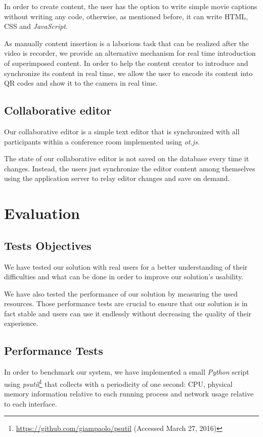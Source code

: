 \documentclass[conference,compsoc,a4paper]{IEEEtran}
\begin{document}
	In order to create content, the user has the option to write simple movie captions without writing any code, otherwise, as mentioned before, it can write \gls{HTML}, \gls{CSS} and \emph{JavaScript}.

	As manually content insertion is a laborious task that can be realized after the video is recorder, we provide an alternative mechanism for real time introduction of superimposed content.	In order to help the content creator to introduce and synchronize its content in real time, we allow the user to encode its content into \gls{QR} codes and show it to the camera in real time.


\subsection{Collaborative editor}

Our collaborative editor is a simple text editor that is synchronized with all participants within a conference room implemented using \emph{ot.js}.

The state of our collaborative editor is not saved on the database every time it changes. Instead, the users just synchronize the editor content among themselves using the application server to relay editor changes and save on demand.

\section{Evaluation}
\label{chapter:evaluation}

\subsection{Tests Objectives}

  We have tested our solution with real users for a better understanding of their difficulties and what can be done in order to improve our solution's usability.

  We have also tested the performance of our solution by measuring the used resources. Those performance tests are crucial to ensure that our solution is in fact stable and users can use it endlessly without decreasing the quality of their experience. 


  \subsection {Performance Tests}

      In order to benchmark our system, we have implemented a small \emph{Python} script using \emph{psutil}\footnote{\url{https://github.com/giampaolo/psutil} (Accessed March 27, 2016)} that collects with a periodicity of one second: CPU, physical memory information relative to each running process and network usage relative to each interface. 
\end{document}
